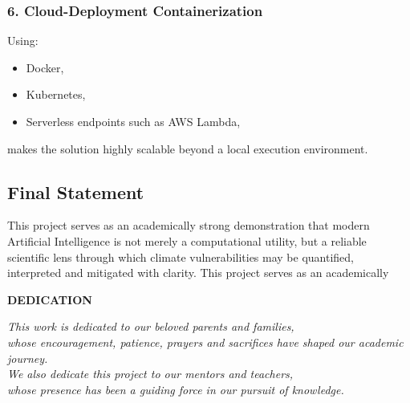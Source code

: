\documentclass[12pt, a4paper]{article}
\begin{document}
\subsubsection*{6. Cloud-Deployment Containerization}
Using:

\begin{itemize}
    \item Docker,
    \item Kubernetes,
    \item Serverless endpoints such as AWS Lambda,
\end{itemize}

makes the solution highly scalable beyond a local execution environment.


\subsection{\textbf{Final Statement}}

\begin{center}
\end{center}

\noindent
This project serves as an academically strong demonstration that modern Artificial Intelligence is not merely a computational utility, but a reliable scientific lens through which climate vulnerabilities may be quantified, interpreted and mitigated with clarity.
This project serves as an academically 

\newpage
\thispagestyle{empty}

\vspace*{4cm}

\begin{center}
{\Large \textbf{DEDICATION}}\\[1.2cm]

\begin{flushleft}
\itshape
This work is dedicated to our beloved parents and families,\\
whose encouragement, patience, prayers and sacrifices have shaped our academic journey.\\[0.4cm]

We also dedicate this project to our mentors and teachers,\\
whose presence has been a guiding force in our pursuit of knowledge.
\end{flushleft}

\end{center}
\newpage
\thispagestyle{empty}
\end{document}
